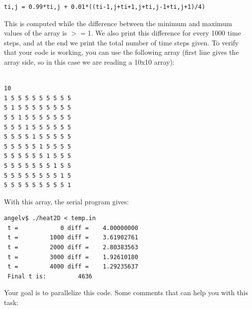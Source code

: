 \begin{verbatim}
ti,j = 0.99*ti,j + 0.01*((ti-1,j+ti+1,j+ti,j-1+ti,j+1)/4)
\end{verbatim}

This is computed while the difference between the minimum and maximum values of
the array is $>=$1. We also print this difference for every 1000 time steps, and
at the end we print the total number of time steps given. To verify that your
code is working, you can use the following array (first line gives the array
side, so in this case we are reading a 10x10 array):

\begin{verbatim}

10
1 5 5 5 5 5 5 5 5 5 
5 1 5 5 5 5 5 5 5 5 
5 5 1 5 5 5 5 5 5 5 
5 5 5 1 5 5 5 5 5 5 
5 5 5 5 1 5 5 5 5 5 
5 5 5 5 5 1 5 5 5 5 
5 5 5 5 5 5 1 5 5 5 
5 5 5 5 5 5 5 1 5 5 
5 5 5 5 5 5 5 5 1 5 
5 5 5 5 5 5 5 5 5 1
\end{verbatim}

With this array, the serial program gives:

\begin{verbatim}
angelv$ ./heat2D < temp.in
 t =            0 diff =    4.00000000    
 t =         1000 diff =    3.61902761    
 t =         2000 diff =    2.80383563    
 t =         3000 diff =    1.92610180    
 t =         4000 diff =    1.29235637    
 Final t is:         4636
\end{verbatim}

Your goal is to parallelize this code. Some comments that can help you with this task:

